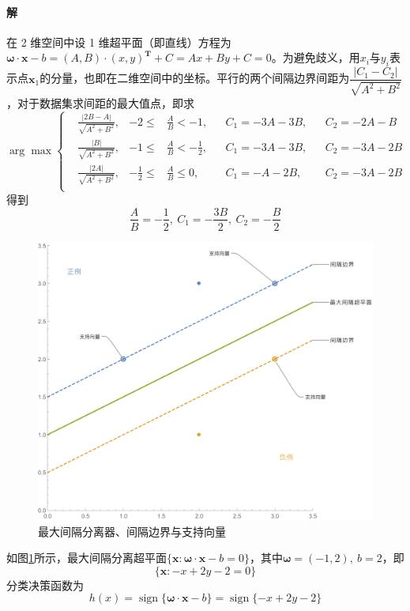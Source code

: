 \documentclass{article}
\DeclareMathOperator{\sign}{sign}
\begin{document}
\paragraph{解}
在 2 维空间中设 1 维超平面（即直线）方程为$\boldsymbol{\omega} \cdot \boldsymbol{x} - b = (A, B) \cdot (x, y)^\mathbf{T} + C = Ax + By + C = 0$。为避免歧义，用$x_i$与$y_i$表示点$\boldsymbol{x}_1$的分量，也即在二维空间中的坐标。平行的两个间隔边界间距为$\dfrac{\left|C_1 - C_2\right|}{\sqrt{A^2 + B^2}}$，对于数据集求间距的最大值点，即求
\begin{equation*}
    \arg\max
    \left\{
    \begin{aligned}
         & \frac{\left|2B-A\right|}{\sqrt{A^2+B^2}}, & -2 \leqslant           & \frac{A}{B} < -1,            &  & C_1 = -3A - 3B, &  & C_2 = -2A - B  \\
         & \frac{\left|B\right|}{\sqrt{A^2+B^2}},    & -1 \leqslant           & \frac{A}{B}  < -\frac{1}{2}, &  & C_1 = -3A - 3B, &  & C_2 = -3A - 2B \\
         & \frac{\left|2 A\right|}{\sqrt{A^2+B^2}},  & -\frac{1}{2} \leqslant & \frac{A}{B} \leqslant 0,     &  & C_1 = -A - 2B , &  & C_2 = -3A - 2B \\
    \end{aligned}
    \right.
\end{equation*}
得到
\begin{equation*}
    \frac{A}{B} = -\frac{1}{2},\ C_1 = -\frac{3B}{2},\ C_2 = -\frac{B}{2}
\end{equation*}
\begin{figure}
    \centering
    \includegraphics[width = \textwidth]{Figure/SVM.pdf}
    \caption{最大间隔分离器、间隔边界与支持向量}
    \label{SVM}
\end{figure}
如图\ref{SVM}所示，最大间隔分离超平面$\{\boldsymbol{x} : \boldsymbol{\omega} \cdot \boldsymbol{x} - b = 0\}$，其中$\boldsymbol{\omega} = (-1, 2),\ b = 2$，即
\begin{equation*}
    \{\boldsymbol{x} : -x + 2y - 2= 0\}
\end{equation*}
分类决策函数为
\begin{equation*}
    h(x) = \sign{\{\boldsymbol{\omega} \cdot \boldsymbol{x} - b\}} = \sign{\{ -x + 2y - 2\}}
\end{equation*}
\end{document}
